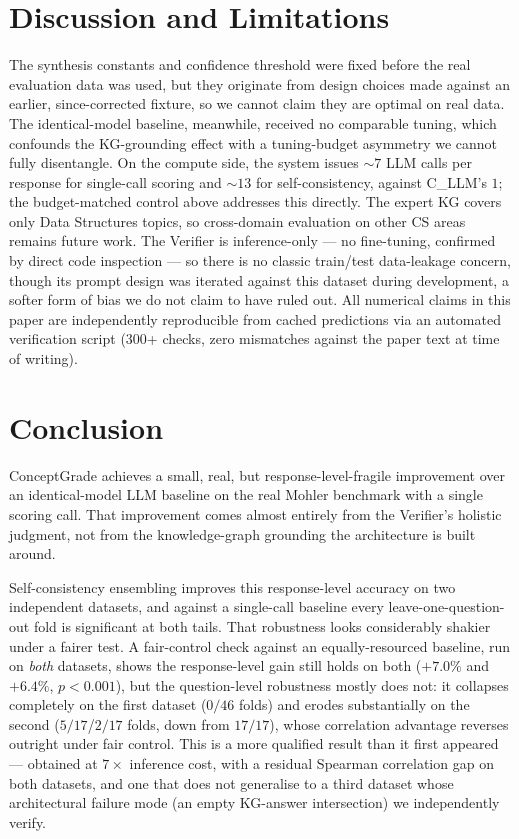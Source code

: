 \documentclass[conference]{IEEEtran}
\begin{document}
\section{Discussion and Limitations}
The synthesis constants and confidence threshold were fixed before the
real evaluation data was used, but they originate from design choices
made against an earlier, since-corrected fixture, so we cannot claim
they are optimal on real data. The identical-model baseline, meanwhile,
received no comparable tuning, which confounds the KG-grounding effect
with a tuning-budget asymmetry we cannot fully disentangle. On the
compute side, the system issues $\sim\!7$ LLM calls per response for
single-call scoring and $\sim\!13$ for self-consistency, against
C\_LLM's $1$; the budget-matched control above addresses this directly.
The expert KG covers only Data Structures topics, so cross-domain
evaluation on other CS areas remains future work. The Verifier is
inference-only — no fine-tuning, confirmed by direct code inspection —
so there is no classic train/test data-leakage concern, though its
prompt design was iterated against this dataset during development, a
softer form of bias we do not claim to have ruled out. All numerical
claims in this paper are independently reproducible from cached
predictions via an automated verification script (300+ checks, zero
mismatches against the paper text at time of writing).

\section{Conclusion}
ConceptGrade achieves a small, real, but response-level-fragile
improvement over an identical-model LLM baseline on the real Mohler
benchmark with a single scoring call. That improvement comes almost
entirely from the Verifier's holistic judgment, not from the
knowledge-graph grounding the architecture is built around.

Self-consistency ensembling improves this response-level accuracy on
two independent datasets, and against a single-call baseline every
leave-one-question-out fold is significant at both tails. That
robustness looks considerably shakier under a fairer test. A
fair-control check against an equally-resourced baseline, run on
\emph{both} datasets, shows the response-level gain still holds on both
($+7.0\%$ and $+6.4\%$, $p<0.001$), but the question-level robustness
mostly does not: it collapses completely on the first dataset ($0/46$
folds) and erodes substantially on the second ($5/17$/$2/17$ folds,
down from $17/17$), whose correlation advantage reverses outright under
fair control. This is a more qualified result than it first appeared —
obtained at $7\times$ inference cost, with a residual Spearman
correlation gap on both datasets, and one that does not generalise to a
third dataset whose architectural failure mode (an empty KG-answer
intersection) we independently verify.
\end{document}
